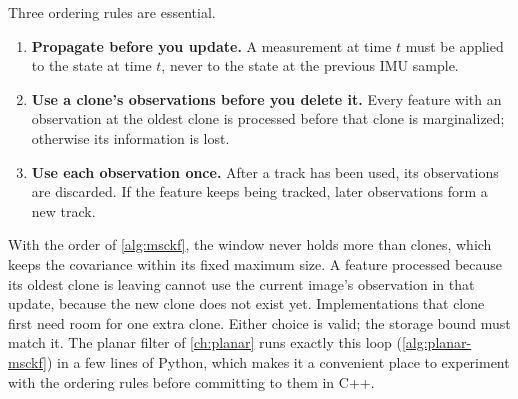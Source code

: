 Three ordering rules are essential.
\begin{enumerate}
  \item \textbf{Propagate before you update.} A measurement at time $t$ must be applied to the state at time $t$, never to the
        state at the previous IMU sample.
  \item \textbf{Use a clone's observations before you delete it.} Every feature with an observation at the oldest clone is
        processed before that clone is marginalized; otherwise its information is lost.
  \item \textbf{Use each observation once.} After a track has been used, its observations are discarded. If the feature keeps
        being tracked, later observations form a new track.
\end{enumerate}
With the order of \cref{alg:msckf}, the window never holds more than  clones, which keeps the covariance within its
fixed maximum size. A feature processed because its oldest clone is leaving cannot use the current image's observation in that
update, because the new clone does not exist yet. Implementations that clone first need room for one extra clone. Either
choice is valid; the storage bound must match it.
The planar filter of \cref{ch:planar} runs exactly this loop (\cref{alg:planar-msckf}) in a few lines of Python, which makes it a
convenient place to experiment with the ordering rules before committing to them in C++.

